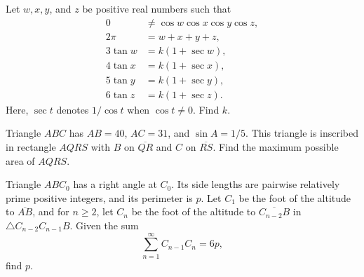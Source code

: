 \documentclass[11pt]{article}
\theoremstyle{definition}
\begin{document}
\begin{question}[name={2015 HMMT, Guts, Problem 28}]
	Let $w,x,y$, and $z$ be positive real numbers such that
	\begin{align*}
		0 &\neq \cos w \cos x \cos y \cos z,\\
		2\pi &= w+x+y+z,\\
		3\tan w &= k(1+\sec w),\\
		4\tan x &= k(1+\sec x),\\
		5\tan y &= k(1+\sec y),\\
		6\tan z &= k(1+\sec z).
	\end{align*}
	Here, $\sec t$ denotes $1/\cos t$ when $\cos t \neq 0$. Find $k$.
\end{question}


%	









\begin{question}[name={2016 AIME I, \href{https://artofproblemsolving.com/community/c4p5966182}{Problem 9}}]
	Triangle $ABC$ has $AB = 40$, $AC = 31$, and $\sin A = 1/5$. This triangle is inscribed in rectangle $AQRS$ with $B$ on $\overline{QR}$ and $C$ on $\overline{RS}$. Find the maximum possible area of $AQRS$.
\end{question}


%	
















\begin{question}[name={2016 AIME II, \href{https://artofproblemsolving.com/community/c4p6023543}{Problem 5}}]
	Triangle $ABC_0$ has a right angle at $C_0$. Its side lengths are pairwise relatively prime positive integers, and its perimeter is $p$. Let $C_1$ be the foot of the altitude to $\overline{AB}$, and for $n\geq 2$, let $C_n$ be the foot of the altitude to $\overline{C_{n-2}B}$ in $\triangle C_{n-2}C_{n-1}B$. Given the sum $$\sum\limits_{n=1}^{\infty}C_{n-1}C_n = 6p,$$ find $p$.
\end{question}
\end{document}
